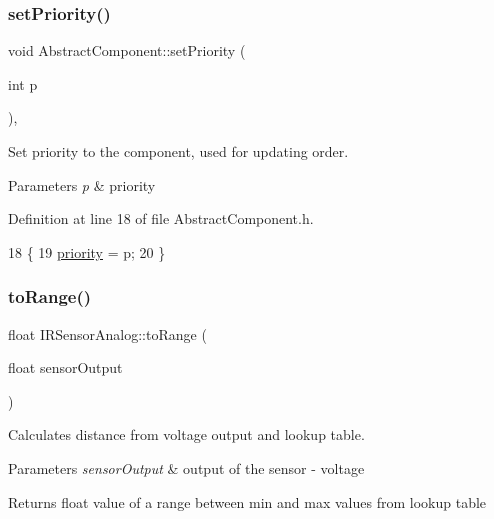 \subsubsection{\texorpdfstring{set\+Priority()}{setPriority()}}
{\footnotesize\ttfamily void Abstract\+Component\+::set\+Priority (\begin{DoxyParamCaption}\item[{int}]{p }\end{DoxyParamCaption})\hspace{0.3cm}{\ttfamily [inline]}, {\ttfamily [inherited]}}



Set priority to the component, used for updating order. 


\begin{DoxyParams}{Parameters}
{\em p} & priority \\
\hline
\end{DoxyParams}


Definition at line 18 of file Abstract\+Component.\+h.


\begin{DoxyCode}
18                             \{
19         \hyperlink{class_abstract_component_aff57dfa5f31be093a06b55560e33fb95}{priority} = p;
20     \}
\end{DoxyCode}
\mbox{\label{class_i_r_sensor_analog_a33ed6c82b3cb6720bfdd6f7598c54699}} 
\subsubsection{\texorpdfstring{to\+Range()}{toRange()}}
{\footnotesize\ttfamily float I\+R\+Sensor\+Analog\+::to\+Range (\begin{DoxyParamCaption}\item[{float}]{sensor\+Output }\end{DoxyParamCaption})\hspace{0.3cm}{\ttfamily [private]}}



Calculates distance from voltage output and lookup table. 


\begin{DoxyParams}{Parameters}
{\em sensor\+Output} & output of the sensor -\/ voltage \\
\hline
\end{DoxyParams}
\begin{DoxyReturn}{Returns}
float value of a range between min and max values from lookup table 
\end{DoxyReturn}


